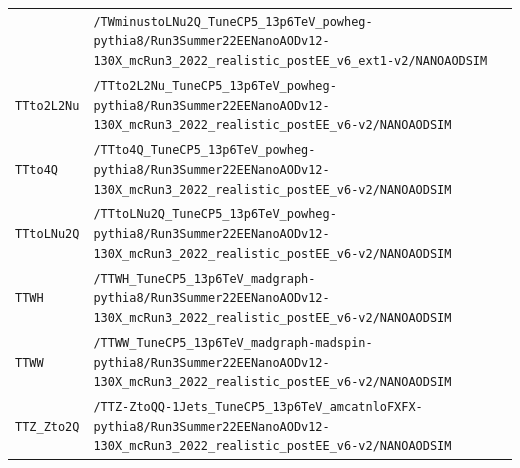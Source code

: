 \begin{longtable}{@{}>{\RaggedRight\arraybackslash}p{} >{\RaggedRight\arraybackslash}p{}@{}}
 & \texttt{/\allowbreak{}TWminustoLNu2Q\_\allowbreak{}TuneCP5\_\allowbreak{}13p6TeV\_\allowbreak{}powheg-\allowbreak{}pythia8/\allowbreak{}Run3Summer22EENanoAODv12-\allowbreak{}130X\_\allowbreak{}mcRun3\_\allowbreak{}2022\_\allowbreak{}realistic\_\allowbreak{}postEE\_\allowbreak{}v6\_\allowbreak{}ext1-\allowbreak{}v2/\allowbreak{}NANOAODSIM} \\
\addlinespace[2pt]
\texttt{TTto2L2Nu} & \texttt{/\allowbreak{}TTto2L2Nu\_\allowbreak{}TuneCP5\_\allowbreak{}13p6TeV\_\allowbreak{}powheg-\allowbreak{}pythia8/\allowbreak{}Run3Summer22EENanoAODv12-\allowbreak{}130X\_\allowbreak{}mcRun3\_\allowbreak{}2022\_\allowbreak{}realistic\_\allowbreak{}postEE\_\allowbreak{}v6-\allowbreak{}v2/\allowbreak{}NANOAODSIM} \\
\addlinespace[2pt]
\texttt{TTto4Q} & \texttt{/\allowbreak{}TTto4Q\_\allowbreak{}TuneCP5\_\allowbreak{}13p6TeV\_\allowbreak{}powheg-\allowbreak{}pythia8/\allowbreak{}Run3Summer22EENanoAODv12-\allowbreak{}130X\_\allowbreak{}mcRun3\_\allowbreak{}2022\_\allowbreak{}realistic\_\allowbreak{}postEE\_\allowbreak{}v6-\allowbreak{}v2/\allowbreak{}NANOAODSIM} \\
\addlinespace[2pt]
\texttt{TTtoLNu2Q} & \texttt{/\allowbreak{}TTtoLNu2Q\_\allowbreak{}TuneCP5\_\allowbreak{}13p6TeV\_\allowbreak{}powheg-\allowbreak{}pythia8/\allowbreak{}Run3Summer22EENanoAODv12-\allowbreak{}130X\_\allowbreak{}mcRun3\_\allowbreak{}2022\_\allowbreak{}realistic\_\allowbreak{}postEE\_\allowbreak{}v6-\allowbreak{}v2/\allowbreak{}NANOAODSIM} \\
\addlinespace[2pt]
\texttt{TTWH} & \texttt{/\allowbreak{}TTWH\_\allowbreak{}TuneCP5\_\allowbreak{}13p6TeV\_\allowbreak{}madgraph-\allowbreak{}pythia8/\allowbreak{}Run3Summer22EENanoAODv12-\allowbreak{}130X\_\allowbreak{}mcRun3\_\allowbreak{}2022\_\allowbreak{}realistic\_\allowbreak{}postEE\_\allowbreak{}v6-\allowbreak{}v2/\allowbreak{}NANOAODSIM} \\
\addlinespace[2pt]
\texttt{TTWW} & \texttt{/\allowbreak{}TTWW\_\allowbreak{}TuneCP5\_\allowbreak{}13p6TeV\_\allowbreak{}madgraph-\allowbreak{}madspin-\allowbreak{}pythia8/\allowbreak{}Run3Summer22EENanoAODv12-\allowbreak{}130X\_\allowbreak{}mcRun3\_\allowbreak{}2022\_\allowbreak{}realistic\_\allowbreak{}postEE\_\allowbreak{}v6-\allowbreak{}v2/\allowbreak{}NANOAODSIM} \\
\addlinespace[2pt]
\texttt{TTZ\_\allowbreak{}Zto2Q} & \texttt{/\allowbreak{}TTZ-\allowbreak{}ZtoQQ-\allowbreak{}1Jets\_\allowbreak{}TuneCP5\_\allowbreak{}13p6TeV\_\allowbreak{}amcatnloFXFX-\allowbreak{}pythia8/\allowbreak{}Run3Summer22EENanoAODv12-\allowbreak{}130X\_\allowbreak{}mcRun3\_\allowbreak{}2022\_\allowbreak{}realistic\_\allowbreak{}postEE\_\allowbreak{}v6-\allowbreak{}v2/\allowbreak{}NANOAODSIM} \\

\end{longtable}
